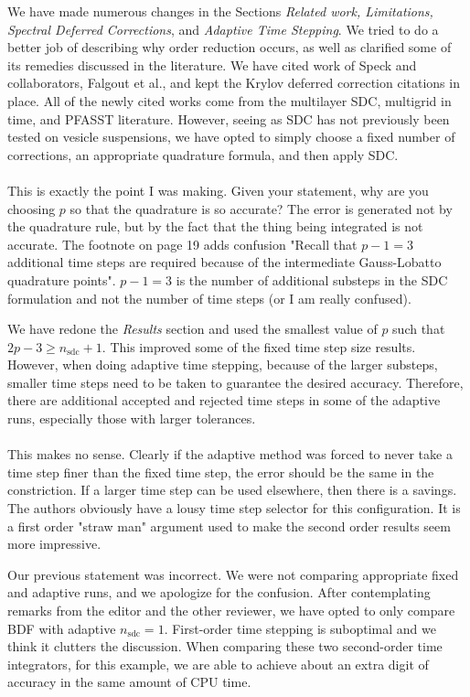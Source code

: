 \documentclass[12pt]{article}
\newcommand{\comment}[1]{{\color{blue} #1}}
\newcommand{\sdc}{{\mathrm{sdc}}}
\begin{document}
We have made numerous changes in the Sections {\em Related work,
Limitations, Spectral Deferred Corrections}, and {\em Adaptive Time
Stepping}.  We tried to do a better job of describing why order
reduction occurs, as well as clarified some of its remedies discussed
in the literature.  We have cited work of Speck and collaborators,
Falgout et al., and kept the Krylov deferred correction citations in
place.  All of the newly cited works come from the multilayer SDC,
multigrid in time, and PFASST literature.  However, seeing as SDC has
not previously been tested on vesicle suspensions, we have opted to
simply choose a fixed number of corrections, an appropriate quadrature
formula, and then apply SDC. \\ \\
\comment{This is exactly the point I was making. Given your statement,
why are you choosing $p$ so that the quadrature is so accurate? The
error is generated not by the quadrature rule, but by the fact that the
thing being integrated is not accurate.  The footnote on page 19 adds
confusion "Recall that $p-1=3$ additional time steps are required
because of the intermediate Gauss-Lobatto quadrature points".  $p-1=3$
is the number of additional substeps in the SDC formulation and not the
number of time steps (or I am really confused).}

We have redone the {\em Results} section and used the smallest value of
$p$ such that $2p-3 \geq n_{\sdc}+1$.  This improved some of the fixed
time step size results.  However, when doing adaptive time stepping,
because of the larger substeps, smaller time steps need to be taken to
guarantee the desired accuracy.  Therefore, there are additional
accepted and rejected time steps in some of the adaptive runs,
especially those with larger tolerances.
\\ \\
\comment{This makes no sense. Clearly if the adaptive method was forced
to never take a time step finer than the fixed time step, the error
should be the same in the constriction. If a larger time step can be
used elsewhere, then there is a savings. The authors obviously have a
lousy time step selector for this configuration. It is a first order
"straw man" argument used to make the second order results seem more
impressive.}

Our previous statement was incorrect.  We were not comparing appropriate
fixed and adaptive runs, and we apologize for the confusion.  After
contemplating remarks from the editor and the other reviewer, we have
opted to only compare BDF with adaptive $n_{\sdc}=1$.  First-order time
stepping is suboptimal and we think it clutters the discussion.  When
comparing these two second-order time integrators, for this example, we
are able to achieve about an extra digit of accuracy in the same amount
of CPU time.
\end{document}
